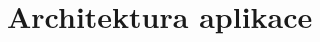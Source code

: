 \documentclass[twoside]{ctuthesis}
\begin{document}
%
%
%
%



\newpage
\section{Architektura aplikace}
\end{document}
